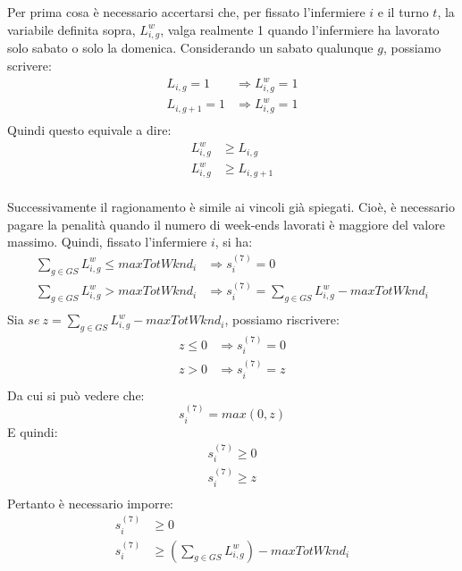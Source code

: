 Per prima cosa è necessario accertarsi che, per fissato l'infermiere $i$ e il turno $t$, la variabile definita sopra, $L_{i, g}^w$, valga realmente 1 quando l'infermiere ha lavorato solo sabato o solo la domenica. Considerando un sabato qualunque $g$, possiamo scrivere:
\begin{equation}
\begin{split}
L_{i, g} = 1 &\Longrightarrow L_{i, g}^w = 1\\
L_{i, g+1} = 1 &\Longrightarrow L_{i, g}^w = 1\\
\end{split}
\end{equation}
Quindi questo equivale a dire:
\begin{equation}
\begin{split}
L_{i, g}^w &\geq L_{i, g}\\
L_{i, g}^w &\geq L_{i, g+1}\\
\end{split}
\end{equation}

Successivamente il ragionamento è simile ai vincoli già spiegati.
Cioè, è necessario pagare la penalità quando il numero di week-ends lavorati è maggiore del valore massimo. Quindi, fissato l'infermiere $i$, si ha:
\begin{equation}
\begin{split}
\sum_{g \in GS} L_{i, g}^w \leq maxTotWknd_i &\Longrightarrow s^{(7)}_{i} = 0\\
\sum_{g \in GS} L_{i, g}^w > maxTotWknd_i &\Longrightarrow s^{(7)}_{i} = \sum_{g \in GS} L_{i, g}^w - maxTotWknd_i\\
\end{split}
\end{equation}
Sia $se ~ z = \sum_{g \in GS} L_{i, g}^w - maxTotWknd_i$, possiamo riscrivere:
\begin{equation}
\begin{split}
z \leq 0 &\Longrightarrow s^{(7)}_{i} = 0\\
z > 0 &\Longrightarrow s^{(7)}_{i} = z\\
\end{split}
\end{equation}
Da cui si può vedere che:
\begin{equation}
\label{eq:maxS7}
s^{(7)}_{i} = max(0, z)
\end{equation}
E quindi:
\begin{equation}
\begin{split}
s^{(7)}_{i} \geq 0\\
s^{(7)}_{i} \geq z\\
\end{split}
\end{equation}
Pertanto è necessario imporre:
\begin{equation}
\begin{split}
s^{(7)}_{i} &\geq 0\\
s^{(7)}_{i} &\geq (\sum_{g \in GS} L_{i, g}^w ) - maxTotWknd_i
\end{split}
\end{equation}

